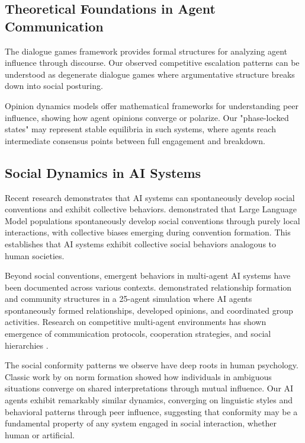 \documentclass[11pt,letterpaper]{article}
\begin{document}
\subsection{Theoretical Foundations in Agent Communication}

The dialogue games framework \citep{mcburney2002dialogue} provides formal structures for analyzing agent influence through discourse. Our observed competitive escalation patterns can be understood as degenerate dialogue games where argumentative structure breaks down into social posturing.

Opinion dynamics models \citep{hegselmann2002opinion} offer mathematical frameworks for understanding peer influence, showing how agent opinions converge or polarize. Our "phase-locked states" may represent stable equilibria in such systems, where agents reach intermediate consensus points between full engagement and breakdown.

\subsection{Social Dynamics in AI Systems}

Recent research demonstrates that AI systems can spontaneously develop social conventions and exhibit collective behaviors. \citet{ashery2025emergent} demonstrated that Large Language Model populations spontaneously develop social conventions through purely local interactions, with collective biases emerging during convention formation. This establishes that AI systems exhibit collective social behaviors analogous to human societies.

Beyond social conventions, emergent behaviors in multi-agent AI systems have been documented across various contexts. \citet{park2023generative} demonstrated relationship formation and community structures in a 25-agent simulation where AI agents spontaneously formed relationships, developed opinions, and coordinated group activities. Research on competitive multi-agent environments has shown emergence of communication protocols, cooperation strategies, and social hierarchies \citep{liang2020emergent,lu2023adversarial}.

The social conformity patterns we observe have deep roots in human psychology. Classic work by \citet{sherif1936psychology} on norm formation showed how individuals in ambiguous situations converge on shared interpretations through mutual influence. Our AI agents exhibit remarkably similar dynamics, converging on linguistic styles and behavioral patterns through peer influence, suggesting that conformity may be a fundamental property of any system engaged in social interaction, whether human or artificial.
\end{document}
